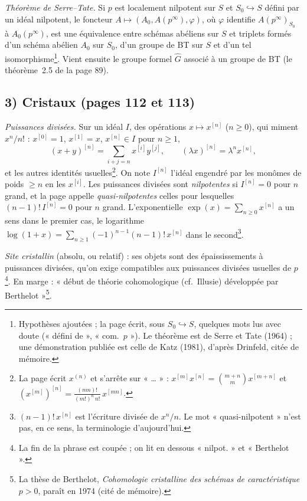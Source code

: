 \documentclass[11pt,a4paper]{article}
\begin{document}
\emph{Théorème de Serre–Tate.} Si $p$ est localement nilpotent sur $S$ et
$S_0 \hookrightarrow S$ défini par un idéal nilpotent, le foncteur
$A \mapsto (A_0, A(p^{\infty}), \varphi)$, où $\varphi$ identifie
$A(p^{\infty})_{S_0}$ à $A_0(p^{\infty})$, est une équivalence entre
schémas abéliens sur $S$ et triplets formés d'un schéma abélien $A_0$ sur
$S_0$, d'un groupe de BT sur $S$ et d'un tel
isomorphisme\footnote{Hypothèses ajoutées ; la page écrit, sous
$S_0 \hookrightarrow S$, quelques mots lus avec doute (« défini de »,
« com.\ $p$ »). Le théorème est de Serre et Tate (1964) ; une
démonstration publiée est celle de Katz (1981), d'après Drinfeld, citée
de mémoire.}. Vient ensuite le groupe formel $\widehat{G}$ associé à un
groupe de BT (le théorème~2.5 de la page 89).

\subsection*{3) Cristaux (pages 112 et 113)}

\emph{Puissances divisées.} Sur un idéal $I$, des opérations $x \mapsto
x^{[n]}$ ($n \geq 0$), qui miment $x^{n}/n!$ : $x^{[0]} = 1$, $x^{[1]} =
x$, $x^{[n]} \in I$ pour $n \geq 1$,
\[
(x+y)^{[n]} = \sum_{i+j=n} x^{[i]} y^{[j]}, \qquad
(\lambda x)^{[n]} = \lambda^{n} x^{[n]},
\]
et les autres identités usuelles\footnote{La page écrit $x^{(n)}$ et
s'arrête sur « … » : $x^{[m]}x^{[n]} = \binom{m+n}{m} x^{[m+n]}$ et
$(x^{[m]})^{[n]} = \frac{(mn)!}{(m!)^{n}\, n!}\, x^{[mn]}$.}. On note
$I^{[n]}$ l'idéal engendré par les monômes de poids $\geq n$ en les
$x^{[i]}$. Les puissances divisées sont \emph{nilpotentes} si $I^{[n]} = 0$
pour $n$ grand, et la page appelle \emph{quasi-nilpotentes} celles pour
lesquelles $(n-1)!\, I^{[n]} = 0$ pour $n$ grand. L'exponentielle $\exp(x)
= \sum_{n \geq 0} x^{[n]}$ a un sens dans le premier cas, le logarithme
$\log(1+x) = \sum_{n \geq 1} (-1)^{n-1} (n-1)!\, x^{[n]}$ dans le
second\footnote{$(n-1)!\, x^{[n]}$ est l'écriture divisée de $x^{n}/n$.
Le mot « quasi-nilpotent » n'est pas, en ce sens, la terminologie
d'aujourd'hui.}.

\emph{Site cristallin} (absolu, ou relatif) : ses objets sont des
épaississements à puissances divisées, qu'on exige compatibles aux
puissances divisées usuelles de $p$\footnote{La fin de la phrase est
coupée ; on lit en dessous « nilpot. » et « Berthelot ».}. En marge :
« début de théorie cohomologique (cf.\ Illusie) développée par
Berthelot »\footnote{La thèse de Berthelot, \emph{Cohomologie cristalline
des schémas de caractéristique $p > 0$}, paraît en 1974 (cité de
mémoire).}.
\end{document}
